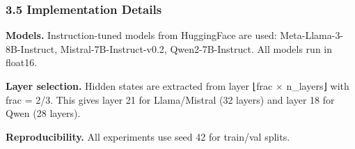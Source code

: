 \subsubsection{3.5 Implementation Details}

\textbf{Models.} Instruction-tuned models from HuggingFace are used: Meta-Llama-3-8B-Instruct, Mistral-7B-Instruct-v0.2, Qwen2-7B-Instruct. All models run in float16.

\textbf{Layer selection.} Hidden states are extracted from layer ⌊frac $\times$ n\_layers⌋ with frac = 2/3. This gives layer 21 for Llama/Mistral (32 layers) and layer 18 for Qwen (28 layers).

\textbf{Reproducibility.} All experiments use seed 42 for train/val splits.
